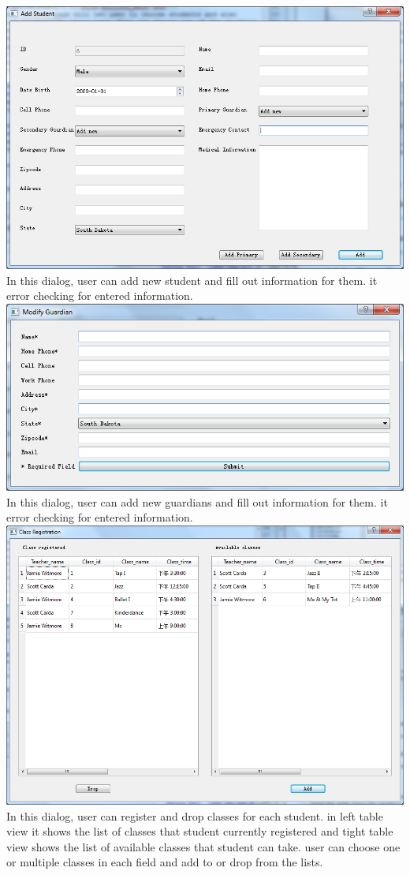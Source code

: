 \includegraphics[scale=0.5]{pics/reg_add.png}\\
In this dialog, user can add new student and fill out information for them. it error checking for entered information.\\
\includegraphics[scale=0.5]{pics/reg_add_gura.png}\\
In this dialog, user can add new guardians and fill out information for them. it error checking for entered information.\\
\includegraphics[scale=0.5]{pics/reg_list.png}\\
In this dialog, user can register and drop classes for each student. in left table view it shows the list of classes that student currently registered and tight table view shows the list of available classes that student can take. user can choose one or multiple classes in each field and add to or drop from the lists.

